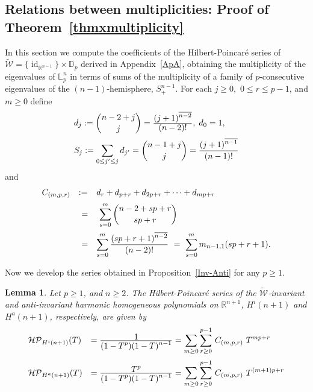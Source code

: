 \documentclass[11pt,a4paper,times]{amsart}
\theoremstyle{plain}
\newtheorem{lemma}[thm]{Lemma}
\theoremstyle{definition}
\numberwithin{equation}{section}
\DeclareMathOperator\id{id}
\newcommand{\ds}{\displaystyle}
\newcommand{\dsum}{\ds\sum}
\newcommand{\eqskip}{ \vspace*{2mm}\\ }
\newcommand{\R}{\mathbb{R}}
\newcommand{\fr}[2]{\frac{\ds #1}{\ds #2}}
\newcommand{\lune}[2]{\mathbb{L}^{#1}_{#2}}
\newcommand{\txtg}{\textcolor{green}}
\begin{document}
{\subsection{Relations between multiplicities: Proof of Theorem~\ref{thmxmultiplicity}\label{Sec 4}}
 In this section we compute the coefficients of the Hilbert-Poincar\'{e} series
of $\tilde{\mathcal{W}}=\{\id_{\R^{n-1}}\}\times \mathbb{D}_p$ derived in  Appendix~\ref{ApA}, obtaining the multiplicity of the
eigenvalues of $\lune{n}{p}$ in terms of sums of the multiplicity of a family of $p$-consecutive eigenvalues of the
$(n-1)$-hemisphere, $S_{+}^{n-1}$.
For each $j\geq 0,$  $0\leq r\leq p-1$,  and $ m\geq 0$ define
\begin{equation}\label{dj}
\begin{array}{lll}
d_j :=  {\ds \binom{n-2+j}{j}} = \fr{(j+1)^{\overline{n-2}}}{(n-2)!},\;  d_0=1,\eqskip
S_j :=\dsum_{0\leq j'\leq j}d_{j'} = \binom{n-1+j}{j}  = \fr{(j+1)^{\overline{n-1}}}{(n-1)!}
\end{array}
\end{equation}
and
\begin{equation}
\begin{array}{lll}
C_{(m,p,r)} & : = & d_r+ d_{p+r}+ d_{2p+r}+\cdots+d_{mp+r}\eqskip
& \ = &~\dsum_{s=0}^{m}{{n-2+s p +r}\choose{s p+ r}}\eqskip
& \ = & \dsum_{s=0}^m\fr{(sp+r+1)^{\overline{n-2}}}{(n-2)!}~=~\dsum_{s=0}^m m_{n-1,1}(sp+r+1).\label{Cmpr}
\end{array}
\end{equation}
%

Now we develop the series obtained in Proposition~\ref{Inv-Anti} for any $p\geq 1$.

\begin{lemma}\label{PSlune}  Let  $p\geq 1$, and $n\geq 2$.
The Hilbert-Poincar\'{e} series of the $\tilde{\mathcal{W}}$-invariant and anti-invariant harmonic homogeneous polynomials on $\mathbb{R}^{n+1}$,  $H^i(n+1)$ and $H^a(n+1)$, respectively, are given by 
\begin{eqnarray*}
\begin{array}{ll}
\mathcal{HP}_{H^i(n+1)}(T) &=
\fr{1}{(1-T^p)(1-T)^{n-1}} = \dsum_{m\geq 0}\dsum_{ r\geq 0}^{ p-1}\, C_{(m,p,r)}\,\, T^{mp+r}\eqskip
\mathcal{HP}_{H^a(n+1)}(T) &= \fr{T^p}{(1-T^p)(1-T)^{n-1}}=\dsum_{m\geq 0}\dsum_{r\geq 0}^{  p-1}\,C_{(m,p,r)}\,\,T^{(m+1)p+r}
\end{array}
\end{eqnarray*}
\end{lemma}

}
\end{document}
